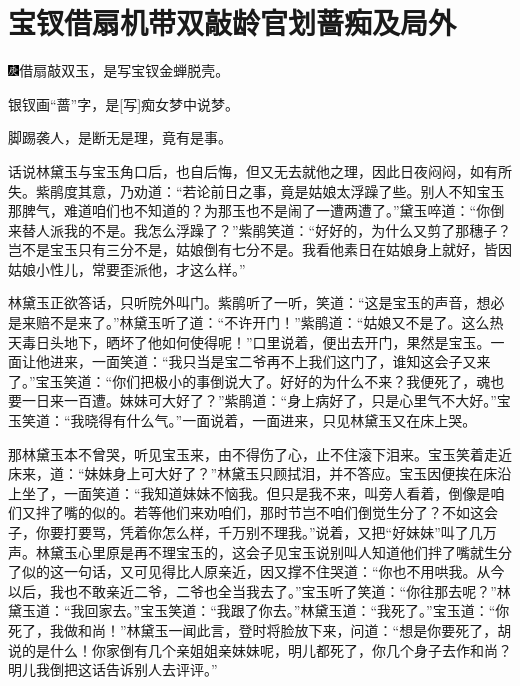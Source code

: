 

\chapter{宝钗借扇机带双敲\hspace{.5em}龄官划蔷痴及局外}

{\includegraphics[width=3mm]{../Images/00004}借扇敲双玉，是写宝钗金蝉脱壳。}

{银钗画``蔷''字，是{[}写{]}痴女梦中说梦。}

{脚踢袭人，是断无是理，竟有是事。}

话说林黛玉与宝玉角口后，也自后悔，但又无去就他之理，因此日夜闷闷，如有所失。紫鹃度其意，乃劝道：``若论前日之事，竟是姑娘太浮躁了些。别人不知宝玉那脾气，难道咱们也不知道的？为那玉也不是闹了一遭两遭了。''黛玉啐道：``你倒来替人派我的不是。我怎么浮躁了？''紫鹃笑道：``好好的，为什么又剪了那穗子？岂不是宝玉只有三分不是，姑娘倒有七分不是。我看他素日在姑娘身上就好，皆因姑娘小性儿，常要歪派他，才这么样。''

林黛玉正欲答话，只听院外叫门。紫鹃听了一听，笑道：``这是宝玉的声音，想必是来赔不是来了。''林黛玉听了道：``不许开门！''紫鹃道：``姑娘又不是了。这么热天毒日头地下，晒坏了他如何使得呢！''口里说着，便出去开门，果然是宝玉。一面让他进来，一面笑道：``我只当是宝二爷再不上我们这门了，谁知这会子又来了。''宝玉笑道：``你们把极小的事倒说大了。好好的为什么不来？我便死了，魂也要一日来一百遭。妹妹可大好了？''紫鹃道：``身上病好了，只是心里气不大好。''宝玉笑道：``我晓得有什么气。''一面说着，一面进来，只见林黛玉又在床上哭。

那林黛玉本不曾哭，听见宝玉来，由不得伤了心，止不住滚下泪来。宝玉笑着走近床来，道：``妹妹身上可大好了？''林黛玉只顾拭泪，并不答应。宝玉因便挨在床沿上坐了，一面笑道：``我知道妹妹不恼我。但只是我不来，叫旁人看着，倒像是咱们又拌了嘴的似的。若等他们来劝咱们，那时节岂不咱们倒觉生分了？不如这会子，你要打要骂，凭着你怎么样，千万别不理我。''说着，又把``好妹妹''叫了几万声。林黛玉心里原是再不理宝玉的，这会子见宝玉说别叫人知道他们拌了嘴就生分了似的这一句话，又可见得比人原亲近，因又撑不住哭道：``你也不用哄我。从今以后，我也不敢亲近二爷，二爷也全当我去了。''宝玉听了笑道：``你往那去呢？''林黛玉道：``我回家去。''宝玉笑道：``我跟了你去。''林黛玉道：``我死了。''宝玉道：``你死了，我做和尚！''林黛玉一闻此言，登时将脸放下来，问道：``想是你要死了，胡说的是什么！你家倒有几个亲姐姐亲妹妹呢，明儿都死了，你几个身子去作和尚？明儿我倒把这话告诉别人去评评。''


